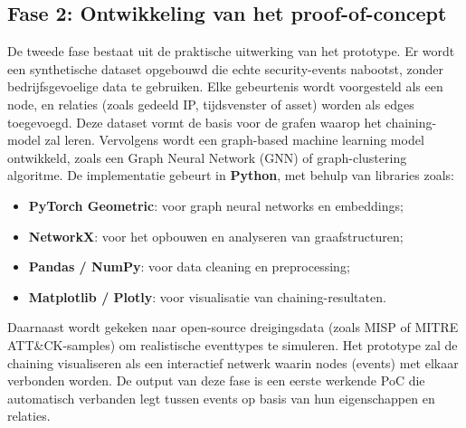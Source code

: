 \subsection{Fase 2: Ontwikkeling van het \newline proof-of-concept}
De tweede fase bestaat uit de praktische uitwerking van het prototype.  
Er wordt een synthetische dataset opgebouwd die echte security-events nabootst, zonder bedrijfsgevoelige data te gebruiken.  
Elke gebeurtenis wordt voorgesteld als een node, en relaties (zoals gedeeld IP, tijdsvenster of asset) worden als edges toegevoegd.  
Deze dataset vormt de basis voor de grafen waarop het chaining-model zal leren.
\newline
\newline
Vervolgens wordt een graph-based machine learning model ontwikkeld, zoals een Graph Neural Network (GNN) of graph-clustering algoritme.  
De implementatie gebeurt in \textbf{Python}, met behulp van libraries zoals:
\begin{itemize}
    \item \textbf{PyTorch Geometric}: voor graph neural networks en embeddings;
    \item \textbf{NetworkX}: voor het opbouwen en analyseren van graafstructuren;
    \item \textbf{Pandas / NumPy}: voor data cleaning en preprocessing;
    \item \textbf{Matplotlib / Plotly}: voor visualisatie van \newline chaining-resultaten.
\end{itemize}
Daarnaast wordt gekeken naar open-source dreigingsdata (zoals MISP of MITRE ATT\&CK-samples) om realistische eventtypes te simuleren.  
Het prototype zal de chaining visualiseren als een interactief netwerk waarin nodes (events) met elkaar verbonden worden.  
\newline
\newline
De output van deze fase is een eerste werkende PoC die automatisch verbanden legt tussen events op basis van hun eigenschappen en relaties.

